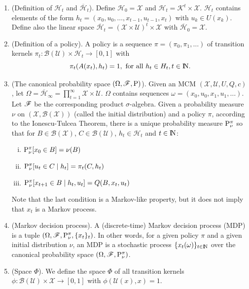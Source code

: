 \documentclass[a4paper,10pt]{scrbook}
\begin{document}
\begin{enumerate}
 \item (Definition of $\mathcal{H}_t$ and $\overline{\mathcal{H}}_t$). Define $\mathcal{H}_0=\mathcal{X}$ and $\mathcal{H}_t = \mathcal{K}^t\times \mathcal{X}$.
       $\mathcal{H}_t$ contains elements of the form $h_t = (x_0,u_0,\ldots,x_{t-1}, u_{t-1}, x_t)$ with $u_k\in U(x_k)$.
       Define also the linear space $\overline{\mathcal{H}}_t = (\mathcal{X}\times \mathcal{U})^{t}\times \mathcal{X}$ with $\overline{\mathcal{H}}_0=\mathcal{X}$.
 \item (Definition of a policy). A policy is a sequence $\pi=(\pi_0,\pi_1,\ldots)$ of transition kernels $\pi_t:\mathcal{B}(\mathcal{U})\times \mathcal{H}_t\to [0,1]$ with 
	\[
	  \pi_t(A(x_t), h_t) = 1,\text{ for all } h_t\in H_t, t\in\N.
	\]
 \item (The canonical probability space $(\Omega,\mathscr{F},\mathrm{P})$). Given an MCM \(\left(\mathcal{X},\mathcal{U}, U, Q, c\right)\), let $\Omega=\overline{\mathcal{H}}_{\infty} = \prod_{t=1}^{\infty}\mathcal{X}\times\mathcal{U}$. 
       $\Omega$ contains sequences $\omega = (x_0,u_0,x_1,u_1,\ldots)$.
       Let $\mathscr{F}$ be the corresponding product $\sigma$-algebra. Given a probability measure $\nu$ on $(\mathcal{X}, \mathcal{B}(\mathcal{X}))$ (called the initial
       distribution) and a policy $\pi$, according to the Ionescu-Tulcea Theorem, there is a unique probability measure $\mathrm{P}_\nu^\pi$ so that
       for $B\in\mathcal{B}(\mathcal{X})$, $C\in\mathcal{B}(\mathcal{U})$, $h_t\in\mathcal{H}_t$ and $t\in\N$:
       \begin{enumerate}[i.]
        \item $\mathrm{P}_\nu^\pi[x_0\in B] = \nu(B)$
        \item $\mathrm{P}_\nu^\pi[u_t\in C\mid h_t] = \pi_t(C, h_t)$
        \item $\mathrm{P}_\nu^\pi[x_{t+1}\in B\mid h_t, u_t] = Q(B, x_t, u_t)$
       \end{enumerate}
       Note that the last condition is a Markov-like property, but it does not imply that $x_t$ is a Markov process.

 \item (Markov decision process). A (discrete-time) Markov decision process (MDP) is a tuple $(\Omega, \mathscr{F}, \mathrm{P}_{\nu}^{\pi}, \{x_t\}_t)$. In other words, 
       for a given policy $\pi$ and a given initial distribution $\nu$, an MDP is a stochastic process $\{x_t(\omega)\}_{t\in\N}$ over the 
       canonical probability space $(\Omega, \mathscr{F}, \mathrm{P}_{\nu}^{\pi})$.
       
 \item (Space $\Phi$). We define the space $\Phi$ of all transition kernels $\phi:\mathcal{B}(\mathcal{U})\times \mathcal{X}\to [0,1]$ with 
       $\phi(\mathcal{U}(x), x)=1$.
       

\end{enumerate}
\end{document}
